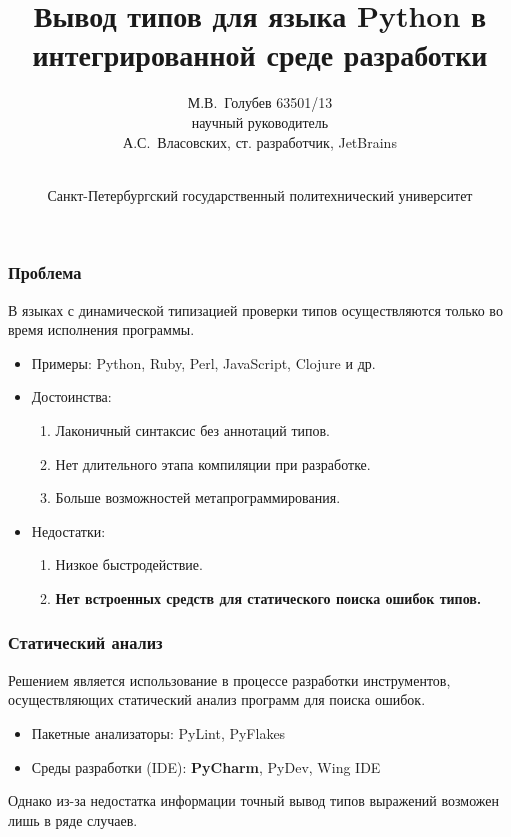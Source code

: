 \documentclass[handout]{beamer}
\title[Вывод типов для Python в IDE]{ Вывод типов для языка Python в интегрированной среде разработки }
\author[М.В.~Голубев]{%
  М.В.~Голубев 63501/13 \\ \vspace{.10cm} 
  {\small научный руководитель} \\ \vspace{.10cm} А.С.~Власовских, ст. разработчик, JetBrains
}
\institute[СПбГПУ]{
  \normalsize
  Направление: 230100 --- Информатика и вычислительная техника \\

  Магистерская программа: 230100.68.15 --- Технологии проектирования системного и
  прикладного программного обеспеченияй
}
\date[20.06.2014]{%
  \\ \vspace{1cm}
  \footnotesize Санкт-Петербургский государственный политехнический университет
}
\begin{document}
\frame{\titlepage}

\begin{frame}
  \frametitle{Проблема}

  В языках с динамической типизацией проверки типов осуществляются только во время исполнения программы.
  \begin{itemize}
      \item Примеры: Python, Ruby, Perl, JavaScript, Clojure и др.
      \item Достоинства:
        \begin{enumerate}
            \item Лаконичный синтаксис без аннотаций типов.
            \item Нет длительного этапа компиляции при разработке.
            \item Больше возможностей метапрограммирования.
        \end{enumerate}
      \item Недостатки:
        \begin{enumerate}
            \item Низкое быстродействие.
            \item \textbf{Нет встроенных средств для статического поиска ошибок типов.}
        \end{enumerate}
  \end{itemize}
    
\end{frame}



\begin{frame}
  \frametitle{Статический анализ}

  Решением является использование в процессе разработки инструментов,
  осуществляющих статический анализ программ для поиска ошибок.

  \begin{itemize}
      \item Пакетные анализаторы: PyLint, PyFlakes
      \item Среды разработки (IDE): \textbf{PyCharm}, PyDev, Wing IDE
  \end{itemize}
    
  Однако из-за недостатка информации точный вывод типов выражений возможен лишь
  в ряде случаев.

\end{frame}
\end{document}
